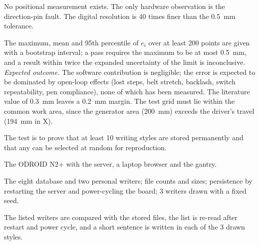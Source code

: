 
            No positional measurement exists.
            The only hardware observation is the direction-pin fault.
            The digital resolution is 40 times finer than the 0.5~mm tolerance.


            The maximum, mean and 95th percentile of $e_i$ over at least 200 points are given with a bootstrap interval; a pass requires the maximum to be at most 0.5~mm, and a result within twice the expanded uncertainty of the limit is inconclusive.
            \emph{Expected outcome.}
            The software contribution is negligible; the error is expected to be dominated by open-loop effects (lost steps, belt stretch, backlash, switch repeatability, pen compliance), none of which has been measured.
            The literature value of 0.3~mm \cite{huang2024} leaves a 0.2~mm margin.
            The test grid must lie within the common work area, since the generator area (200~mm) exceeds the driver's travel (194~mm in X).


\medskip
\label{sec:res-qtp6}


            The test is to prove that at least 10 writing styles are stored permanently and that any can be selected at random for reproduction.


            The ODROID N2+ with the server, a laptop browser and the gantry.


            The eight database and two personal writers; file counts and sizes; persistence by restarting the server and power-cycling the board; 3 writers drawn with a fixed seed.


            The listed writers are compared with the stored files, the list is re-read after restart and power cycle, and a short sentence is written in each of the 3 drawn styles.

